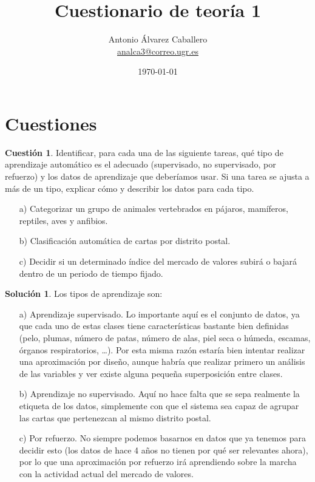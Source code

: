\documentclass[a4paper, 11pt]{article}
\title{Cuestionario de teoría 1}
\author{Antonio Álvarez Caballero\\
    \href{mailto:analca3@correo.ugr.es}{analca3@correo.ugr.es}}
\date{\today}
\theoremstyle{definition}
\newtheorem{cuestion}{Cuestión}
\newtheorem*{solucion}{Solución}
\begin{document}
  \maketitle

  \section{Cuestiones}

  \begin{cuestion}
    Identificar, para cada una de las siguiente tareas, qué tipo de aprendizaje automático es el adecuado (supervisado, no supervisado, por refuerzo) y los datos de aprendizaje que deberíamos usar. Si una tarea se ajusta a más de un tipo, explicar cómo y describir los datos para cada tipo.
    \begin{enumerate}
      \item[a)] Categorizar un grupo de animales vertebrados en pájaros, mamíferos, reptiles, aves y anfibios.
      \item[b)] Clasificación automática de cartas por distrito postal.
      \item[c)] Decidir si un determinado índice del mercado de valores subirá o bajará dentro de un periodo de tiempo fijado.
    \end{enumerate}

  \end{cuestion}

  \begin{solucion}
    Los tipos de aprendizaje son:
    \begin{enumerate}
      \item[a)] Aprendizaje supervisado. Lo importante aquí es el conjunto de datos, ya que cada uno de estas clases tiene características bastante bien definidas (pelo, plumas, número de patas, número de alas, piel seca o húmeda, escamas, órganos respiratorios, \ldots). Por esta misma razón estaría bien intentar realizar una aproximación por diseño, aunque habría que realizar primero un análisis de las variables y ver existe alguna pequeña superposición entre clases.
      \item[b)] Aprendizaje no supervisado. Aquí no hace falta que se sepa realmente la etiqueta de los datos, simplemente con que el sistema sea capaz de agrupar las cartas que pertenezcan al mismo distrito postal.
      \item[c)] Por refuerzo. No siempre podemos basarnos en datos que ya tenemos para decidir esto (los datos de hace 4 años no tienen por qué ser relevantes ahora), por lo que una aproximación por refuerzo irá aprendiendo sobre la marcha con la actividad actual del mercado de valores.
    \end{enumerate}
  \end{solucion}
\end{document}
